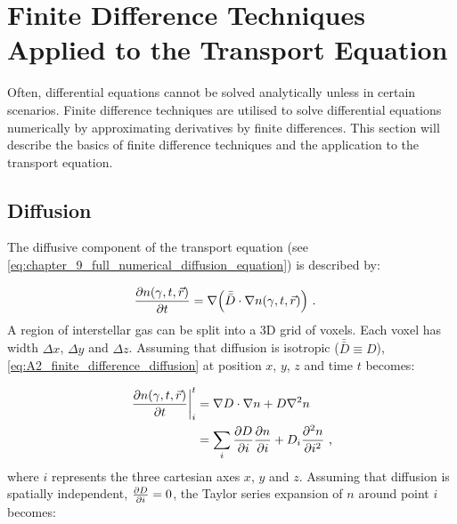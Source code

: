 \chapter[Finite Difference Techniques]{Finite Difference Techniques Applied to the Transport Equation} \label{sec:A2_finite_difference}

Often, differential equations cannot be solved analytically unless in certain scenarios. Finite difference techniques are utilised to solve differential equations numerically by approximating derivatives by finite differences. This section will describe the basics of finite difference techniques and the application to the transport equation.

\section{Diffusion} \label{sec:A2_diffusion}
The diffusive component of the transport equation (see \autoref{eq:chapter_9_full_numerical_diffusion_equation}) is described by:

\begin{equation}
    \begin{aligned}
    \pdv{n\qty(\gamma,t,\vec{r})}{t}&=\nabla \qty(\bar{\bar{D}}\cdot\nabla n\qty(\gamma,t,\vec{r}))\text{ .} 
    \end{aligned} \label{eq:A2_finite_difference_diffusion}
\end{equation}
\noindent A region of interstellar gas can be split into a 3D grid of voxels. Each voxel has width $\Delta x$, $\Delta y$ and $\Delta z$. Assuming that diffusion is isotropic ($\bar{\bar{D}}\equiv D$), \autoref{eq:A2_finite_difference_diffusion} at position $x$, $y$, $z$ and time $t$ becomes:

\begin{equation}
    \begin{aligned}
    \pdv{n\qty(\gamma,t,\vec{r})}{t}\bigg|_{i}^t &= \nabla D\cdot\nabla n + D\nabla^2 n \\
    &= \sum_{i} \pdv{D}{i}\pdv{n}{i}+ D_i\pdv[2]{n}{i}\text{ ,} 
    \end{aligned} \label{eq:A2_finite_difference_diffusion_expanded}
\end{equation}
\noindent where $i$ represents the three cartesian axes $x$, $y$ and $z$. Assuming that diffusion is spatially independent, $\pdv{D}{i}=0$, the Taylor series expansion of $n$ around point $i$ becomes:

